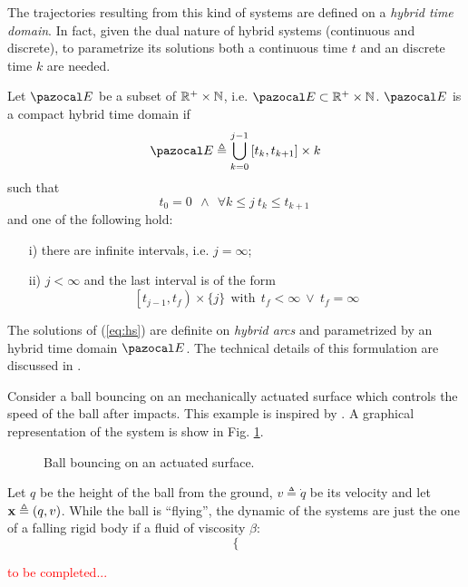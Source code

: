 %
The trajectories resulting from this kind of systems are defined on a \textit{hybrid time domain}. In fact, given the dual nature of hybrid systems (continuous and discrete), to parametrize its solutions both a continuous time $t$ and an discrete time $k$ are needed.
%
\begin{defn}
    Let $\E$ be a subset of $\mathbb{R}^+\times\mathbb{N}$, i.e. $\E\subset\R^+\times\mathbb{N}$. $\E$ is a compact hybrid time domain if 
    \begin{equation}
        \E\triangleq\bigcup_{k = 0}^{j-1}\left[t_k,t_{k+1}\right]\times {k} 
    \end{equation}
    such that
    \begin{equation}
        t_0 = 0~~\land~~\forall k\leq j~t_k\leq t_{k+1}~
    \end{equation}
    and one of the following hold:
    \begin{itemize}
        \item [i)] there are infinite intervals, i.e. $j = \infty$;
        \item [ii)] $j<\infty$ and the last interval is of the form
        \begin{equation}
            \left[t_{j-1},t_f\right)\times \{j\}~~\text{with}~~t_f<\infty~\lor~t_f = \infty
        \end{equation}
    \end{itemize}
\end{defn}
%
The solutions of (\ref{eq:hs}) are definite on \textit{hybrid arcs} and parametrized by an hybrid time domain $\E$. The technical details of this formulation are discussed in \citep{Goebel2012}. 
%
\begin{exmp}
    Consider a ball bouncing on an mechanically actuated surface which controls the speed of the ball after impacts. This example is inspired by \citep{naldi2013passivity}. A graphical representation of the system is show in Fig. \ref{fig:bb}.
    \begin{figure}[h]
        \centering
        
        \caption[Ball bouncing on an actuated surface]{Ball bouncing on an actuated surface.}
        \label{fig:bb}
    \end{figure}
    Let $q$ be the height of the ball from the ground, $v\triangleq\dot{q}$ be its velocity and let $\mathbf{x}\triangleq(q,v)$. While the ball is ``flying'', the dynamic of the systems are just the one of a falling rigid body if a fluid of viscosity $\beta$:
    \begin{equation}
        \left\{
        
        \right.
    \end{equation}
\end{exmp}
%
\begin{exmp}
\textcolor{red}{to be completed...}
\end{exmp}
%
